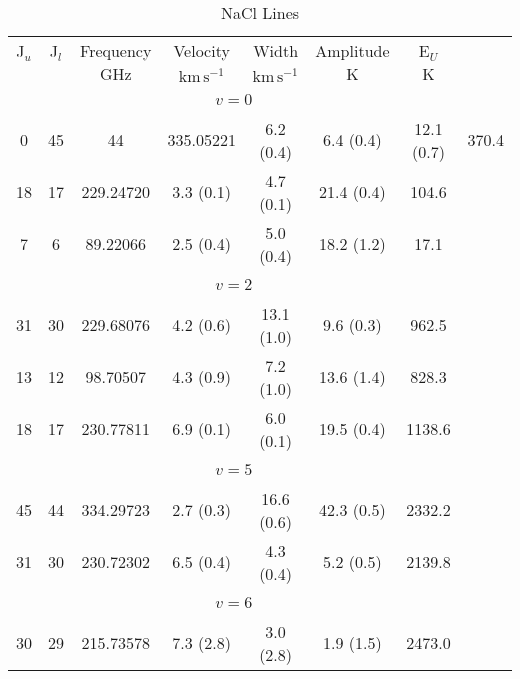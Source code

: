 \begin{table*}[htp]
\centering
\caption{NaCl Lines}
\begin{tabular}{ccccccc}
\label{tab:NaCl_salt_lines}
 J$_u$ & J$_l$ & Frequency & Velocity & Width & Amplitude & E$_U$ \\
  &  & $\mathrm{GHz}$ & $\mathrm{km\,s^{-1}}$ & $\mathrm{km\,s^{-1}}$ & $\mathrm{K}$ & $\mathrm{K}$ \\
\hline
&\vspace{-0.75em}\\
 \\
\vspace{-0.75em}\\
0 & 45 & 44 & 335.05221 & 6.2 (0.4) & 6.4 (0.4) & 12.1 (0.7) & 370.4 \\
 18 & 17 & 229.24720 & 3.3 (0.1) & 4.7 (0.1) & 21.4 (0.4) & 104.6 \\
 7 & 6 & 89.22066 & 2.5 (0.4) & 5.0 (0.4) & 18.2 (1.2) & 17.1 \\
&\vspace{-0.75em}\\
 \\
\vspace{-0.75em}\\
 31 & 30 & 229.68076 & 4.2 (0.6) & 13.1 (1.0) & 9.6 (0.3) & 962.5 \\
 13 & 12 & 98.70507 & 4.3 (0.9) & 7.2 (1.0) & 13.6 (1.4) & 828.3 \\
 18 & 17 & 230.77811 & 6.9 (0.1) & 6.0 (0.1) & 19.5 (0.4) & 1138.6 \\
&\vspace{-0.75em}\\
 \\
\vspace{-0.75em}\\
 45 & 44 & 334.29723 & 2.7 (0.3) & 16.6 (0.6) & 42.3 (0.5) & 2332.2 \\
 31 & 30 & 230.72302 & 6.5 (0.4) & 4.3 (0.4) & 5.2 (0.5) & 2139.8 \\
&\vspace{-0.75em}\\
 \\
\vspace{-0.75em}\\
 30 & 29 & 215.73578 & 7.3 (2.8) & 3.0 (2.8) & 1.9 (1.5) & 2473.0 \\
\hline
\end{tabular}

\par 
\end{table*}
